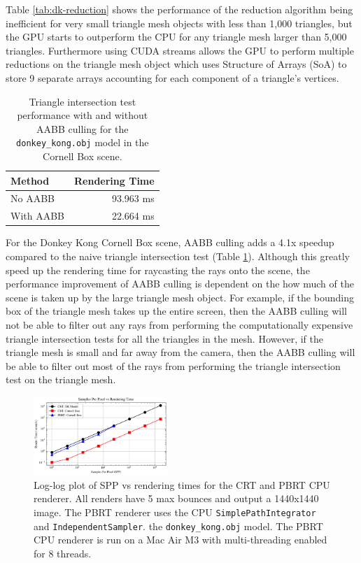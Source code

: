 \documentclass[../main.tex]{subfiles}
\begin{document}
Table \ref{tab:dk-reduction} shows the performance of the reduction algorithm
being inefficient for very small triangle mesh objects with less than 1,000
triangles, but the GPU starts to outperform the CPU for any triangle mesh larger
than 5,000 triangles. Furthermore using CUDA streams allows the GPU to perform
multiple reductions on the triangle mesh object which uses Structure of Arrays (SoA)
to store 9 separate arrays accounting for each component of a triangle's vertices.
  
\begin{table}[h]
    \caption{Triangle intersection test performance with and without AABB culling for
    the \texttt{donkey\_kong.obj} model in the Cornell Box scene.}
    \label{tab:aabb-speedup}
    \centering
    \begin{tabular}{|l|r|}
      \hline
      \textbf{Method} & \textbf{Rendering Time} \\
      \hline
      No AABB & 93.963 ms \\
      \hline
      With AABB & 22.664 ms \\
      \hline
    \end{tabular}
\end{table}

For the Donkey Kong Cornell Box scene, AABB culling adds a 4.1x speedup compared to the naive
triangle intersection test (Table \ref{tab:aabb-speedup}). Although this greatly
speed up the rendering time for raycasting the rays onto the scene, the performance improvement 
of AABB culling is dependent on the how much of the scene is taken up by the large
triangle mesh object. For example, if the bounding box of the triangle mesh
takes up the entire screen, then the AABB culling will not be able to filter
out any rays from performing the computationally expensive triangle intersection tests for all
the triangles in the mesh. However, if the triangle mesh is small and far away
from the camera, then the AABB culling will be able to filter out most of the rays
from performing the triangle intersection test on the triangle mesh.

\begin{figure}[h]
    \centering
    \includegraphics[width=0.45\textwidth]{render_time_vs_spp.png}
    \caption{Log-log plot of SPP vs rendering times for the CRT and PBRT CPU renderer.
    All renders have 5 max bounces and output a 1440x1440 image. The PBRT renderer
    uses the CPU \texttt{SimplePathIntegrator} and \texttt{IndependentSampler}.
    the \texttt{donkey\_kong.obj} model. The PBRT CPU renderer is run on a
    Mac Air M3 with multi-threading enabled for 8 threads.}
    \label{fig:crt_pbrt}
\end{figure}
\end{document}
